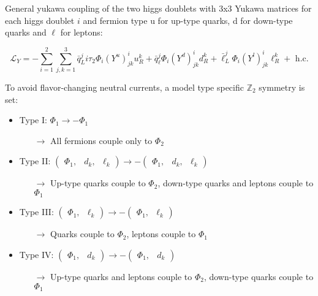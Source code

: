 \documentclass[12pt,oneside]{book}
\begin{document}
General yukawa coupling of the two higgs doublets with 3x3 Yukawa matrices for each higgs doublet $i$ and fermion type u for up-type quarks, d for down-type quarks and $\ell$ for leptons:

\begin{equation}
    \mathcal{L}_{Y} = - \sum_{i = 1}^{2}\sum_{j, k = 1}^{3} \bar{q}_L^{j}i\tau_2\Phi_i(Y^{u})^{i}_{jk}u_{R}^{k} + \bar{q}_\ell^{j}\Phi_i(Y^{d})^{i}_{jk}d_{R}^{k} + \bar{\ell}_L^{j}\Phi_i(Y^{l})^{i}_{jk}\ell_{R}^{k} + \text{ h.c.}
\end{equation} 

To avoid flavor-changing neutral currents, a model type specific $\mathbb{Z}_2$ symmetry is set:

\begin{itemize}
    \item Type I: $\Phi_1 \to -\Phi_1$
        \begin{itemize}
            \item[$\to$] All fermions couple only to $\Phi_2$
        \end{itemize}
    \item Type II: $\begin{pmatrix} \Phi_1, & d_k, & \ell_k \end{pmatrix} \to - \begin{pmatrix} \Phi_1, & d_k, & \ell_k \end{pmatrix}$
        \begin{itemize}
            \item[$\to$] Up-type quarks couple to $\Phi_2$, down-type quarks and leptons couple to $\Phi_1$
        \end{itemize}
    \item Type III: $\begin{pmatrix} \Phi_1, & \ell_k \end{pmatrix} \to - \begin{pmatrix} \Phi_1, & \ell_k \end{pmatrix}$
        \begin{itemize}
            \item[$\to$] Quarks couple to $\Phi_2$, leptons couple to $\Phi_1$
        \end{itemize}
    \item Type IV: $\begin{pmatrix} \Phi_1, & d_k \end{pmatrix} \to - \begin{pmatrix} \Phi_1, & d_k \end{pmatrix}$
        \begin{itemize}
            \item[$\to$] Up-type quarks and leptons couple to $\Phi_2$, down-type quarks couple to $\Phi_1$
        \end{itemize}
\end{itemize}
\end{document}
